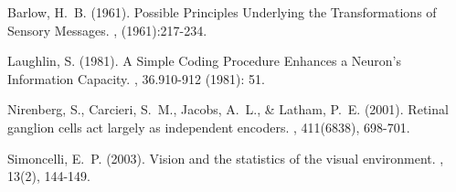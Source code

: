 \documentclass[twoside]{article}
\begin{document}
\begin{multicols}{2}
\begin{thebibliography}{99} 

Barlow, H.~B. (1961).
\newblock Possible Principles Underlying the Transformations of Sensory Messages.
, (1961):217-234.

Laughlin, S. (1981).
\newblock A Simple Coding Procedure Enhances a Neuron's Information Capacity.
, 36.910-912 (1981): 51.

Nirenberg, S., Carcieri, S.~M., Jacobs, A.~L., \& Latham, P.~E. (2001).
\newblock Retinal ganglion cells act largely as independent encoders.
, 411(6838), 698-701.

Simoncelli, E.~P. (2003).
\newblock  Vision and the statistics of the visual environment.
, 13(2), 144-149.
 
\end{thebibliography}



\end{multicols}
\end{document}

